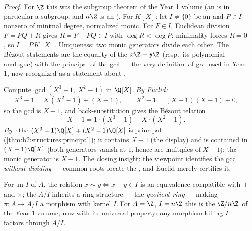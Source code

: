 \begin{proof}
For $\Z$ this was the subgroup theorem of the Year 1 volume (an 
is in particular a subgroup, and $n\Z$ is an ). For $K[X]$: let
$I \neq \{0\}$ be an  and $P \in I$ nonzero of minimal degree,
normalized monic. For $F \in I$, Euclidean division $F = PQ + R$
gives $R = F - PQ \in I$ with $\deg R < \deg P$: minimality forces $R
= 0$, so $I = P\,K[X]$. Uniqueness: two monic generators divide each
other. The Bézout statements are the equality of the  $x\Z +
y\Z$ (resp.\ its polynomial analogue) with the principal  of the
gcd --- the very definition of gcd used in Year 1, now recognized as
a statement about .
\end{proof}

\begin{example}\label{ex:b2:structures:polygcd}
Compute $\gcd(X^3 - 1,\ X^2 - 1)$ in $\Q[X]$. \emph{By Euclid:}
\[
X^3 - 1 = X\,(X^2 - 1) + (X - 1),
\qquad
X^2 - 1 = (X + 1)(X - 1) + 0 ,
\]
so the gcd is $X - 1$, and back-substitution gives the Bézout
relation
\[
X - 1 = 1\cdot(X^3 - 1) - X\cdot(X^2 - 1).
\]
\emph{By :} the  $(X^3 - 1)\Q[X] + (X^2 - 1)\Q[X]$ is
principal (\cref{thm:b2:structures:principal}); it contains $X -
1$ (the display) and is contained in $(X - 1)\Q[X]$ (both
generators vanish at $1$, hence are multiples of $X - 1$): the
monic generator is $X - 1$. The closing insight: the 
viewpoint identifies the gcd \emph{without dividing} --- common
roots locate the , and Euclid merely certifies it.
\end{example}

\begin{definition}\label{def:b2:structures:quotientring}
For an  $I$ of $A$, the relation $x \sim y \iff x - y \in I$ is
an equivalence compatible with $+$ and $\times$; the 
$A/I$ inherits a ring structure --- the \emph{quotient
ring} --- making $\pi \colon A \to A/I$ a
morphism with kernel $I$. For $A = \Z$, $I = n\Z$ this is the
$\Z/n\Z$ of the Year 1 volume, now with its universal property: any
morphism killing $I$ factors through $A/I$.
\end{definition}

